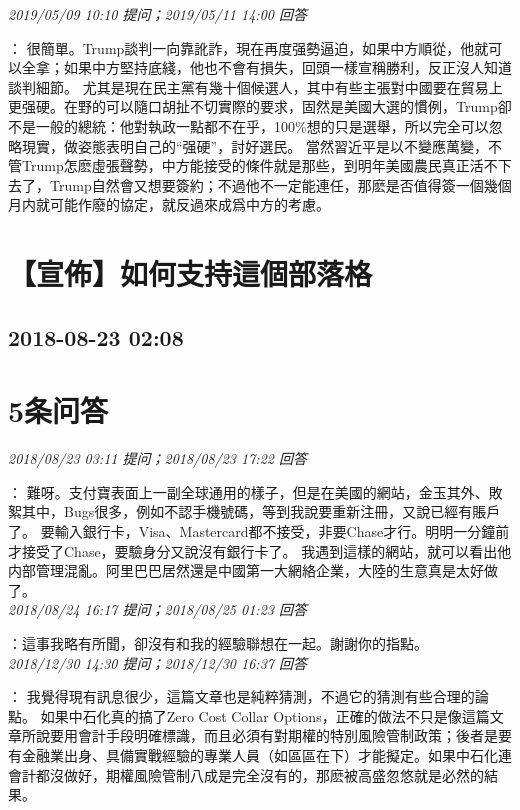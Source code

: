 \documentclass[twocolumn]{ctexart}
\begin{document}
\textit{\hfill\noindent\small 2019/05/09 10:10 提问；2019/05/11 14:00 回答}

：
很簡單。Trump談判一向靠訛詐，現在再度强勢逼迫，如果中方順從，他就可以全拿；如果中方堅持底綫，他也不會有損失，回頭一樣宣稱勝利，反正沒人知道談判細節。 
尤其是現在民主黨有幾十個候選人，其中有些主張對中國要在貿易上更强硬。在野的可以隨口胡扯不切實際的要求，固然是美國大選的慣例，Trump卻不是一般的總統：他對執政一點都不在乎，100\%想的只是選舉，所以完全可以忽略現實，做姿態表明自己的“强硬”，討好選民。 
當然習近平是以不變應萬變，不管Trump怎麽虛張聲勢，中方能接受的條件就是那些，到明年美國農民真正活不下去了，Trump自然會又想要簽約；不過他不一定能連任，那麽是否值得簽一個幾個月内就可能作廢的協定，就反過來成爲中方的考慮。
\\


\section{【宣佈】如何支持這個部落格}
\subsection{2018-08-23 02:08}


\section{5条问答}

\textit{\hfill\noindent\small 2018/08/23 03:11 提问；2018/08/23 17:22 回答}

：
難呀。支付寶表面上一副全球通用的樣子，但是在美國的網站，金玉其外、敗絮其中，Bugs很多，例如不認手機號碼，等到我說要重新注冊，又說已經有賬戶了。
要輸入銀行卡，Visa、Mastercard都不接受，非要Chase才行。明明一分鐘前才接受了Chase，要驗身分又說沒有銀行卡了。
我遇到這樣的網站，就可以看出他内部管理混亂。阿里巴巴居然還是中國第一大網絡企業，大陸的生意真是太好做了。
\\

\textit{\hfill\noindent\small 2018/08/24 16:17 提问；2018/08/25 01:23 回答}

：這事我略有所聞，卻沒有和我的經驗聯想在一起。謝謝你的指點。
\\

\textit{\hfill\noindent\small 2018/12/30 14:30 提问；2018/12/30 16:37 回答}

：
我覺得現有訊息很少，這篇文章也是純粹猜測，不過它的猜測有些合理的論點。
如果中石化真的搞了Zero Cost Collar Options，正確的做法不只是像這篇文章所說要用會計手段明確標識，而且必須有對期權的特別風險管制政策；後者是要有金融業出身、具備實戰經驗的專業人員（如區區在下）才能擬定。如果中石化連會計都沒做好，期權風險管制八成是完全沒有的，那麽被高盛忽悠就是必然的結果。
\\
\end{document}
